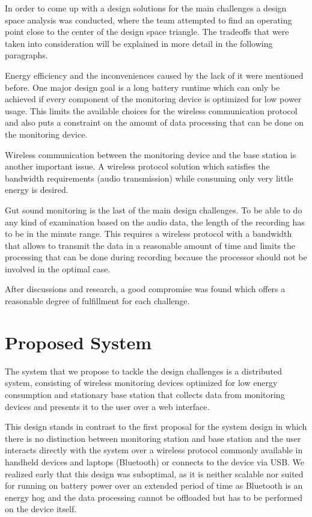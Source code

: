 In order to come up with a design solutions for the main challenges a design space analysis was conducted, where the team attempted to find an operating point close to the center of the design space triangle. The tradeoffs that were taken into consideration will be explained in more detail in the following paragraphs.  

Energy efficiency and the inconveniences caused by the lack of it were mentioned before. One major design goal is a long battery runtime which can only be achieved if every component of the monitoring device is optimized for low power usage. This limits the available choices for the wireless communication protocol and also puts a constraint on the amount of data processing that can be done on the monitoring device.
 
Wireless communication between the monitoring device and the base station is another important issue. A wireless protocol solution which satisfies the bandwidth requirements (audio transmission) while consuming only very little energy is desired. 

Gut sound monitoring is the last of the main design challenges. To be able to do any kind of examination based on the audio data, the length of the recording has to be in the minute range. This requires a wireless protocol with a bandwidth that allows to transmit the data in a reasonable amount of time and limits the processing that can be done during recording because the processor should not be involved in the optimal case.


After discussions and research, a good compromise was found which offers a reasonable degree of fulfillment for each challenge.


\section{Proposed System}
The system that we propose to tackle the design challenges is a distributed system, consisting of wireless monitoring devices optimized for low energy consumption and stationary base station that collects data from monitoring devices and presents it to the user over a web interface. 

This design stands in contrast to the first proposal for the system design in which there is no distinction between monitoring station and base station and the user interacts directly with the system over a wireless protocol commonly available in handheld devices and laptops (Bluetooth) or connects to the device via USB. We realized early that this design was suboptimal, as it is neither scalable nor suited for running on battery power over an extended period of time as Bluetooth is an energy hog and the data processing cannot be offloaded but has to be performed on the device itself.

